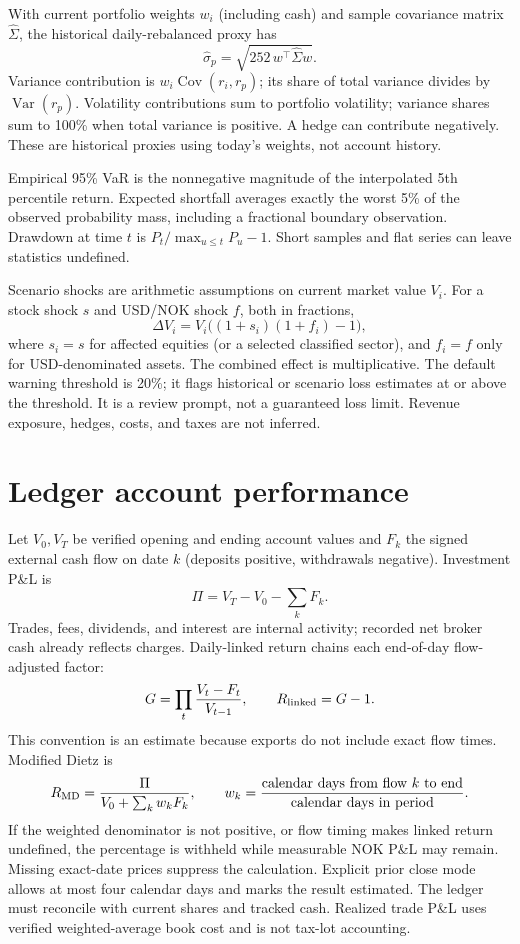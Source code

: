 \documentclass[11pt]{article}
\begin{document}
With current portfolio weights $w_i$ (including cash) and sample covariance
matrix $\widehat\Sigma$, the historical daily-rebalanced proxy has
\[
\widehat\sigma_p=\sqrt{252\,w^\top\widehat\Sigma w}.
\]
Variance contribution is $w_i\operatorname{Cov}(r_i,r_p)$; its share of total
variance divides by $\operatorname{Var}(r_p)$. Volatility contributions sum
to portfolio volatility; variance shares sum to 100\% when total variance is
positive. A hedge can contribute negatively. These are historical proxies
using today's weights, not account history.

Empirical 95\% VaR is the nonnegative magnitude of the interpolated 5th
percentile return. Expected shortfall averages exactly the worst 5\% of the
observed probability mass, including a fractional boundary observation.
Drawdown at time $t$ is $P_t/\max_{u\leq t}P_u-1$. Short samples and flat
series can leave statistics undefined.

Scenario shocks are arithmetic assumptions on current market value $V_i$.
For a stock shock $s$ and USD/NOK shock $f$, both in fractions,
\[
\Delta V_i=V_i\big((1+s_i)(1+f_i)-1\big),
\]
where $s_i=s$ for affected equities (or a selected classified sector), and
$f_i=f$ only for USD-denominated assets. The combined effect is multiplicative.
The default warning threshold is 20\%; it flags historical or scenario loss
estimates at or above the threshold. It is a review prompt, not a guaranteed
loss limit. Revenue exposure, hedges, costs, and taxes are not inferred.

\section{Ledger account performance}

Let $V_0,V_T$ be verified opening and ending account values and $F_k$ the
signed external cash flow on date $k$ (deposits positive, withdrawals
negative). Investment P\&L is
\[
\Pi=V_T-V_0-\sum_kF_k.
\]
Trades, fees, dividends, and interest are internal activity; recorded net
broker cash already reflects charges. Daily-linked return chains each
end-of-day flow-adjusted factor:
\[
G=\prod_t\frac{V_t-F_t}{V_{t-1}},\qquad R_{\rm linked}=G-1.
\]
This convention is an estimate because exports do not include exact flow
times. Modified Dietz is
\[
R_{\rm MD}=\frac{\Pi}{V_0+\sum_k w_kF_k},\qquad
w_k=\frac{\text{calendar days from flow }k\text{ to end}}
{\text{calendar days in period}}.
\]
If the weighted denominator is not positive, or flow timing makes linked
return undefined, the percentage is withheld while measurable NOK P\&L may
remain. Missing exact-date prices suppress the calculation. Explicit prior
close mode allows at most four calendar days and marks the result estimated.
The ledger must reconcile with current shares and tracked cash. Realized trade
P\&L uses verified weighted-average book cost and is not tax-lot accounting.
\end{document}
